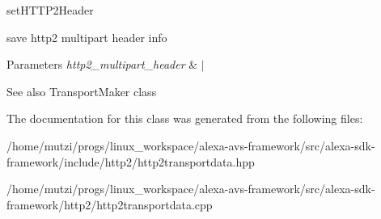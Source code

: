 set\+H\+T\+T\+P2\+Header 

save http2 multipart header info 
\begin{DoxyParams}{Parameters}
{\em http2\+\_\+multipart\+\_\+header} & $\vert$ \\
\hline
\end{DoxyParams}
\begin{DoxySeeAlso}{See also}
Transport\+Maker class 
\end{DoxySeeAlso}


The documentation for this class was generated from the following files\+:\begin{DoxyCompactItemize}
\item 
/home/mutzi/progs/linux\+\_\+workspace/alexa-\/avs-\/framework/src/alexa-\/sdk-\/framework/include/http2/http2transportdata.\+hpp\item 
/home/mutzi/progs/linux\+\_\+workspace/alexa-\/avs-\/framework/src/alexa-\/sdk-\/framework/http2/http2transportdata.\+cpp\end{DoxyCompactItemize}

